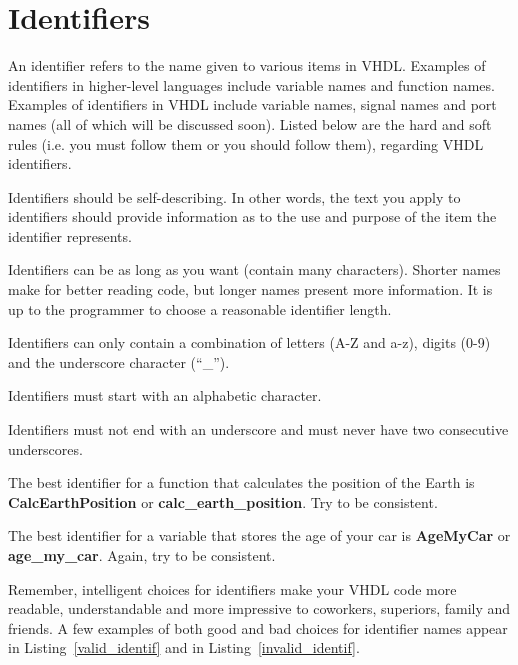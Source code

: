 \section{Identifiers}
An identifier refers to the name given to various items in VHDL. Examples of identifiers in higher-level languages include variable names and function names. Examples of identifiers in VHDL include variable names, signal names and port names (all of which will be discussed soon). Listed below are the hard and soft rules (i.e. you must follow them or you should follow them), regarding VHDL identifiers.

\begin{my_list}
\item Identifiers should be self-describing. In other words, the text you apply to identifiers should provide information as to the use and purpose of the item the identifier represents.
\item Identifiers can be as long as you want (contain many characters). Shorter names make for better reading code, but longer names present more information. It is up to the programmer to choose a reasonable identifier length.
\item Identifiers can only contain a combination of letters (A-Z and a-z), digits (0-9) and the underscore character (``\_'').
\item Identifiers must start with an alphabetic character.
\item Identifiers must not end with an underscore and must never have two consecutive underscores.
\item The best identifier for a function that calculates the position of the Earth is \textbf{CalcEarthPosition} or \textbf{calc\_earth\_position}. Try to be consistent.
\item The best identifier for a variable that stores the age of your car is \textbf{AgeMyCar} or \textbf{age\_my\_car}. Again, try to be consistent.
\end{my_list}
Remember, intelligent choices for identifiers make your VHDL code more readable, understandable and more impressive to coworkers, superiors, family and friends. A few examples of both good and bad choices for identifier names appear in Listing~\ref{valid_identif} and in Listing~\ref{invalid_identif}.

